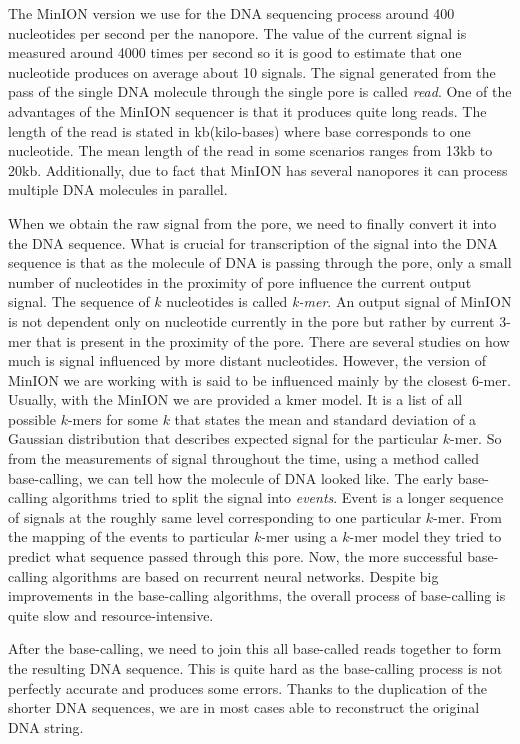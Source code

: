 The MinION version we use for the DNA sequencing process around 400 nucleotides per second
per the nanopore. The value of the current signal is measured around 4000 times per second so it is good to
estimate that one nucleotide produces on average about 10 signals. The signal
generated from the pass of the single DNA molecule through the single pore is called \textit{read}.
One of the advantages of the MinION sequencer is that it produces quite long reads.
The length of the read is stated in kb(kilo-bases) where base corresponds to one nucleotide.
The mean length of the read in some scenarios ranges from 13kb to 20kb. Additionally,
due to fact that MinION has several nanopores it can process multiple DNA molecules in
parallel.


When we obtain the raw signal from the pore, we need to finally convert it into the DNA
sequence. What is crucial for transcription of the signal into the DNA sequence is
that as the molecule of DNA is passing through the pore, only a small
number of nucleotides in the proximity of pore influence the current output signal.
The sequence of $k$ nucleotides is called \textit{k-mer}. An output signal of MinION
is not dependent only on nucleotide currently in the pore but rather by current
3-mer that is present in the proximity of the pore. There are several studies on
how much is signal influenced by more distant nucleotides. However, the version
of MinION we are working with is said to be influenced mainly by the closest 6-mer. 
Usually, with the MinION we are provided a kmer model. It is a list of all possible
$k$-mers for some $k$ that states the mean and standard deviation of a Gaussian
distribution that describes expected signal for the particular $k$-mer.
So from the measurements of signal throughout the time, using a method called base-calling, we can tell how the molecule
of DNA looked like. The early base-calling algorithms tried to split the signal into
\textit{events}. Event is a longer sequence of signals at the roughly same level corresponding
to one particular $k$-mer. From the mapping of the events to particular $k$-mer using
a $k$-mer model they tried to predict what sequence passed through this pore.
Now, the more successful base-calling algorithms are based on recurrent neural
networks. Despite big improvements in the base-calling algorithms, the overall
process of base-calling is quite slow and resource-intensive. 

After the base-calling, we need to join this all base-called reads together to form the
resulting DNA sequence. This is quite hard as the base-calling process is not perfectly
accurate and produces some errors. Thanks to the duplication of the shorter DNA
sequences, we are in most cases able to reconstruct the original DNA string.

